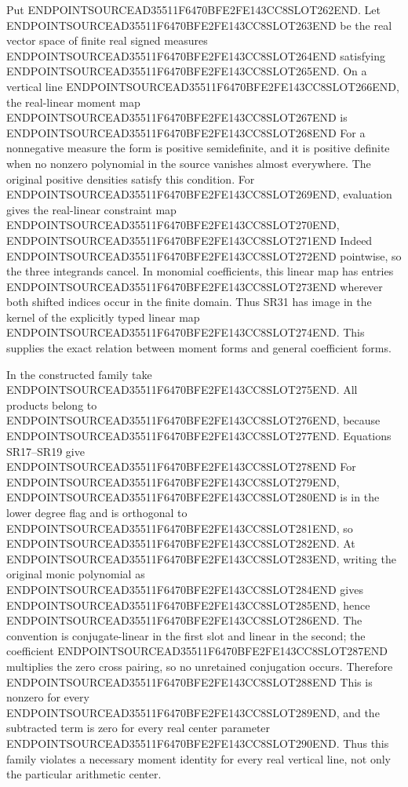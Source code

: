 Put ENDPOINTSOURCEAD35511F6470BFE2FE143CC8SLOT262END. Let ENDPOINTSOURCEAD35511F6470BFE2FE143CC8SLOT263END be the real vector space of finite real signed measures ENDPOINTSOURCEAD35511F6470BFE2FE143CC8SLOT264END satisfying ENDPOINTSOURCEAD35511F6470BFE2FE143CC8SLOT265END. On a vertical line ENDPOINTSOURCEAD35511F6470BFE2FE143CC8SLOT266END, the real-linear moment map ENDPOINTSOURCEAD35511F6470BFE2FE143CC8SLOT267END is ENDPOINTSOURCEAD35511F6470BFE2FE143CC8SLOT268END For a nonnegative measure the form is positive semidefinite, and it is positive definite when no nonzero polynomial in the source vanishes almost everywhere. The original positive densities satisfy this condition. For ENDPOINTSOURCEAD35511F6470BFE2FE143CC8SLOT269END, evaluation gives the real-linear constraint map ENDPOINTSOURCEAD35511F6470BFE2FE143CC8SLOT270END, ENDPOINTSOURCEAD35511F6470BFE2FE143CC8SLOT271END Indeed ENDPOINTSOURCEAD35511F6470BFE2FE143CC8SLOT272END pointwise, so the three integrands cancel. In monomial coefficients, this linear map has entries ENDPOINTSOURCEAD35511F6470BFE2FE143CC8SLOT273END wherever both shifted indices occur in the finite domain. Thus SR31 has image in the kernel of the explicitly typed linear map ENDPOINTSOURCEAD35511F6470BFE2FE143CC8SLOT274END. This supplies the exact relation between moment forms and general coefficient forms.

In the constructed family take ENDPOINTSOURCEAD35511F6470BFE2FE143CC8SLOT275END. All products belong to ENDPOINTSOURCEAD35511F6470BFE2FE143CC8SLOT276END, because ENDPOINTSOURCEAD35511F6470BFE2FE143CC8SLOT277END. Equations SR17--SR19 give ENDPOINTSOURCEAD35511F6470BFE2FE143CC8SLOT278END For ENDPOINTSOURCEAD35511F6470BFE2FE143CC8SLOT279END, ENDPOINTSOURCEAD35511F6470BFE2FE143CC8SLOT280END is in the lower degree flag and is orthogonal to ENDPOINTSOURCEAD35511F6470BFE2FE143CC8SLOT281END, so ENDPOINTSOURCEAD35511F6470BFE2FE143CC8SLOT282END. At ENDPOINTSOURCEAD35511F6470BFE2FE143CC8SLOT283END, writing the original monic polynomial as ENDPOINTSOURCEAD35511F6470BFE2FE143CC8SLOT284END gives ENDPOINTSOURCEAD35511F6470BFE2FE143CC8SLOT285END, hence ENDPOINTSOURCEAD35511F6470BFE2FE143CC8SLOT286END. The convention is conjugate-linear in the first slot and linear in the second; the coefficient ENDPOINTSOURCEAD35511F6470BFE2FE143CC8SLOT287END multiplies the zero cross pairing, so no unretained conjugation occurs. Therefore ENDPOINTSOURCEAD35511F6470BFE2FE143CC8SLOT288END This is nonzero for every ENDPOINTSOURCEAD35511F6470BFE2FE143CC8SLOT289END, and the subtracted term is zero for every real center parameter ENDPOINTSOURCEAD35511F6470BFE2FE143CC8SLOT290END. Thus this family violates a necessary moment identity for every real vertical line, not only the particular arithmetic center.

